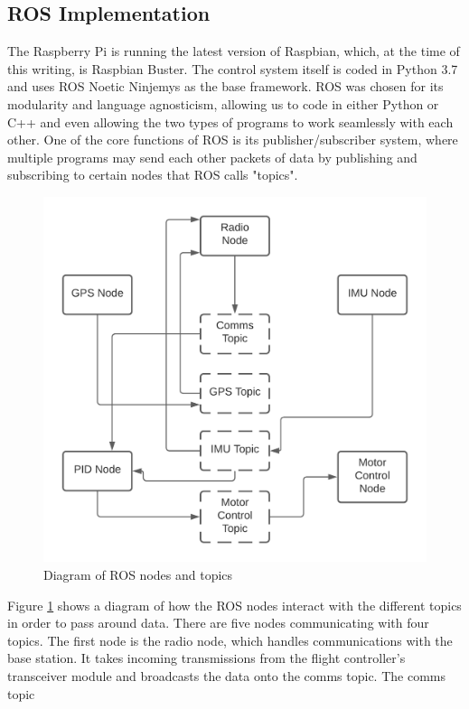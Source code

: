 \documentclass[english]{upeeei}
\begin{document}
\subsection{ROS Implementation}
The Raspberry Pi is running the latest version of Raspbian, which, at the time of this writing, is Raspbian Buster. The control system itself is coded in Python 3.7 and
uses ROS Noetic Ninjemys \cite{ROSNoetic} as the base framework. ROS was chosen for its modularity and language agnosticism, allowing us
to code in either Python or C++ and even allowing the two types of programs to work seamlessly with each other. One of the core functions
of ROS is its publisher/subscriber system, where multiple programs may send each other packets of data by publishing and subscribing to
certain nodes that ROS calls "topics". 
\begin{figure}[h]
    \centering
    \includegraphics[scale=0.6]{images/rostopics.png}
    \caption{Diagram of ROS nodes and topics}
    \label{fig:ros_topics}
\end{figure}
Figure \ref{fig:ros_topics} shows a diagram of how the ROS nodes interact with the different topics in order to pass around data.
There are five nodes communicating with four topics. The first node is the radio node, which handles communications with the base station. It
takes incoming transmissions from the flight controller's transceiver module and broadcasts the data onto the comms topic. The comms topic
\end{document}
